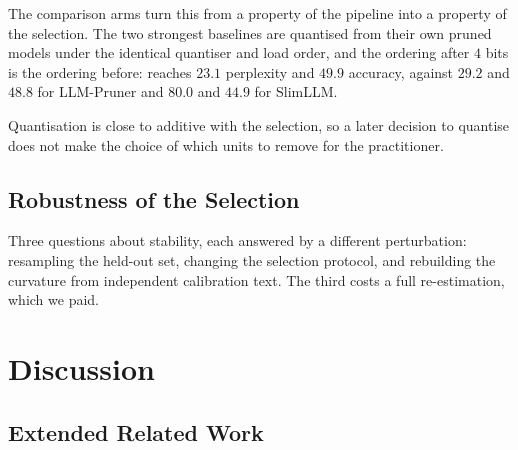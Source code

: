 The comparison arms turn this from a property of the pipeline into a property of the selection. The
two strongest baselines are quantised from their own pruned models under the identical quantiser and
load order, and the ordering after $4$ bits is the ordering before: \method reaches $23.1$ perplexity
and $49.9$ accuracy, against $29.2$ and $48.8$ for LLM-Pruner and $80.0$ and $44.9$ for SlimLLM.

Quantisation is close to additive with the selection, so a later decision to quantise does not make
the choice of which units to remove for the practitioner.

\begin{table}[htbp]
\centering
\caption{\textbf{Pruning composes with $4$-bit quantisation} (Llama-3.1-8B-Instruct). Each row is
one model state measured twice; the last two columns are the within-row cost of quantising it.
Perplexity on WikiText-2, accuracy the eight-task multiple-choice mean. The quantiser and the load
order are identical in every row.}
\label{tab:quant}

\end{table}

\subsection{Robustness of the Selection}

\label{app:robustness}

Three questions about stability, each answered by a different perturbation: resampling the held-out
set, changing the selection protocol, and rebuilding the curvature from independent calibration text.
The third costs a full re-estimation, which we paid.







\section{Discussion}
\label{app:discussion}
\subsection{Extended Related Work}

